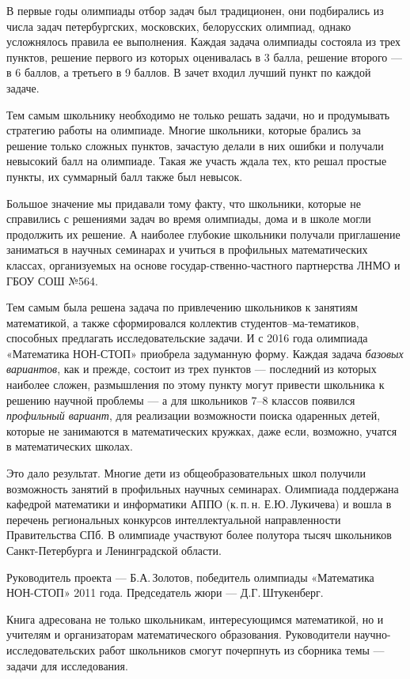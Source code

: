 \ms\abz В первые годы олимпиады отбор задач был традиционен, они подбирались из числа задач петербургских, московских, белорусских олимпиад, однако усложнялось правила ее выполнения. Каждая задача олимпиады состояла из трех пунктов, решение первого из которых оценивалась в 3 балла, решение второго — в 6 баллов, а третьего в 9 баллов. В зачет входил лучший пункт по каждой задаче.

\ms\abz Тем самым школьнику необходимо не только решать задачи, но и продумывать стратегию работы на олимпиаде. Многие школьники, которые брались за решение только сложных пунктов, зачастую делали в них ошибки и получали невысокий балл на олимпиаде. Такая же участь ждала тех, кто решал простые пункты, их суммарный балл также был невысок.

\ms\abz Большое значение мы придавали тому факту, что школьники, которые не справились с решениями задач во время олимпиады, дома и в школе могли продолжить их решение. А наиболее глубокие школьники получали приглашение заниматься в научных семинарах и учиться в профильных математических классах, организуемых на основе государ-\linebreak ственно-частного партнерства ЛНМО и ГБОУ СОШ №564.

\ms\abz Тем самым была решена задача по привлечению школьников к занятиям математикой, а также сформировался коллектив студентов–ма-\linebreak тематиков, способных предлагать исследовательские задачи. И с 2016 года олимпиада «Математика НОН-СТОП» приобрела задуманную форму. Каждая задача {\itshape базовых вариантов}, как и прежде, состоит из трех пунктов — последний из которых наиболее сложен, размышления по этому пункту могут привести школьника к решению научной проблемы — а для школьников 7–8 классов появился {\itshape профильный вариант}, для реализации возможности поиска одаренных детей, которые не занимаются в математических кружках, даже если, возможно, учатся в математических школах.

\ms\abz Это дало результат. Многие дети из общеобразовательных школ получили возможность занятий в профильных научных семинарах. Олимпиада поддержана кафедрой математики и информатики АППО (к.\,п.\,н. Е.Ю.\,Лукичева) и вошла в перечень региональных конкурсов интеллектуальной направленности Правительства СПб. В олимпиаде участвуют более полутора тысяч школьников Санкт-Петербурга и Ленинградской области.

\ms\abz Руководитель проекта — Б.А.\,Золотов, победитель олимпиады «Математика НОН-СТОП» 2011 года. Председатель жюри — Д.Г.\,Штукенберг.   

\ms\abz Книга адресована не только школьникам, интересующимся математикой, но и учителям и организаторам математического образования. Руководители научно-исследовательских работ школьников смогут почерпнуть из сборника темы — задачи для исследования. 